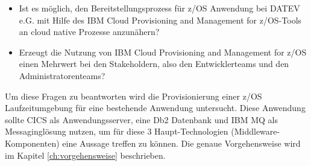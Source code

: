 \begin{samepage}
\begin{itemize}
\item Ist es möglich, den Bereitstellungsprozess für z/OS Anwendung bei DATEV e.G. mit Hilfe des \glqq IBM Cloud Provisioning and Management for z/OS\grqq-Tools an cloud native Prozesse anzunähern?
\item Erzeugt die Nutzung von \glqq IBM Cloud Provisioning and Management for z/OS\grqq{} einen Mehrwert bei den Stakeholdern, also den Entwicklerteams und den Administratorenteams?
\end{itemize}
\end{samepage}

Um diese Fragen zu beantworten wird die Provisionierung einer z/OS Laufzeitumgebung für eine bestehende Anwendung untersucht.
Diese Anwendung sollte CICS als Anwendungsserver, eine Db2 Datenbank und IBM MQ als Messaginglösung nutzen, um für diese 3 Haupt-Technologien (Middleware-Komponenten) eine Aussage treffen zu können.
Die genaue Vorgehensweise wird im Kapitel \ref{ch:vorgehensweise} beschrieben.
